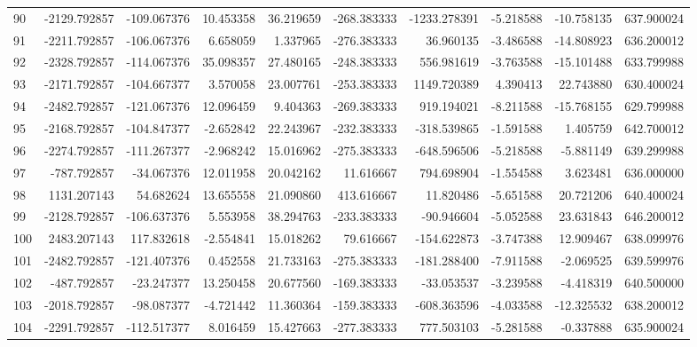 \begin{tabular}{lrrrrrrrrr}
90  &  -2129.792857 &  -109.067376 &  10.453358 &  36.219659 &  -268.383333 & -1233.278391 &  -5.218588 & -10.758135 &  637.900024 \\
91  &  -2211.792857 &  -106.067376 &   6.658059 &   1.337965 &  -276.383333 &    36.960135 &  -3.486588 & -14.808923 &  636.200012 \\
92  &  -2328.792857 &  -114.067376 &  35.098357 &  27.480165 &  -248.383333 &   556.981619 &  -3.763588 & -15.101488 &  633.799988 \\
93  &  -2171.792857 &  -104.667377 &   3.570058 &  23.007761 &  -253.383333 &  1149.720389 &   4.390413 &  22.743880 &  630.400024 \\
94  &  -2482.792857 &  -121.067376 &  12.096459 &   9.404363 &  -269.383333 &   919.194021 &  -8.211588 & -15.768155 &  629.799988 \\
95  &  -2168.792857 &  -104.847377 &  -2.652842 &  22.243967 &  -232.383333 &  -318.539865 &  -1.591588 &   1.405759 &  642.700012 \\
96  &  -2274.792857 &  -111.267377 &  -2.968242 &  15.016962 &  -275.383333 &  -648.596506 &  -5.218588 &  -5.881149 &  639.299988 \\
97  &   -787.792857 &   -34.067376 &  12.011958 &  20.042162 &    11.616667 &   794.698904 &  -1.554588 &   3.623481 &  636.000000 \\
98  &   1131.207143 &    54.682624 &  13.655558 &  21.090860 &   413.616667 &    11.820486 &  -5.651588 &  20.721206 &  640.400024 \\
99  &  -2128.792857 &  -106.637376 &   5.553958 &  38.294763 &  -233.383333 &   -90.946604 &  -5.052588 &  23.631843 &  646.200012 \\
100 &   2483.207143 &   117.832618 &  -2.554841 &  15.018262 &    79.616667 &  -154.622873 &  -3.747388 &  12.909467 &  638.099976 \\
101 &  -2482.792857 &  -121.407376 &   0.452558 &  21.733163 &  -275.383333 &  -181.288400 &  -7.911588 &  -2.069525 &  639.599976 \\
102 &   -487.792857 &   -23.247377 &  13.250458 &  20.677560 &  -169.383333 &   -33.053537 &  -3.239588 &  -4.418319 &  640.500000 \\
103 &  -2018.792857 &   -98.087377 &  -4.721442 &  11.360364 &  -159.383333 &  -608.363596 &  -4.033588 & -12.325532 &  638.200012 \\
104 &  -2291.792857 &  -112.517377 &   8.016459 &  15.427663 &  -277.383333 &   777.503103 &  -5.281588 &  -0.337888 &  635.900024 \\

\end{tabular}
